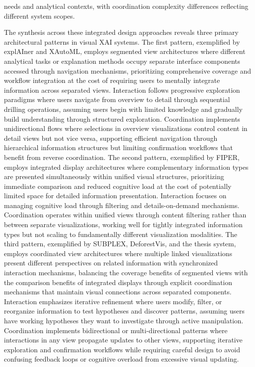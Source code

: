 needs and analytical contexts, with coordination complexity differences reflecting different system scopes.

The synthesis across these integrated design approaches reveals three primary architectural patterns in visual XAI systems. The first pattern, exemplified by explAIner and XAutoML, employs segmented view architectures where different analytical tasks or explanation methods occupy separate interface components accessed through navigation mechanisms, prioritizing comprehensive coverage and workflow integration at the cost of requiring users to mentally integrate information across separated views. Interaction follows progressive exploration paradigms where users navigate from overview to detail through sequential drilling operations, assuming users begin with limited knowledge and gradually build understanding through structured exploration. Coordination implements unidirectional flows where selections in overview visualizations control content in detail views but not vice versa, supporting efficient navigation through hierarchical information structures but limiting confirmation workflows that benefit from reverse coordination. The second pattern, exemplified by FIPER, employs integrated display architectures where complementary information types are presented simultaneously within unified visual structures, prioritizing immediate comparison and reduced cognitive load at the cost of potentially limited space for detailed information presentation. Interaction focuses on managing cognitive load through filtering and details-on-demand mechanisms. Coordination operates within unified views through content filtering rather than between separate visualizations, working well for tightly integrated information types but not scaling to fundamentally different visualization modalities. The third pattern, exemplified by SUBPLEX, DeforestVis, and the thesis system, employs coordinated view architectures where multiple linked visualizations present different perspectives on related information with synchronized interaction mechanisms, balancing the coverage benefits of segmented views with the comparison benefits of integrated displays through explicit coordination mechanisms that maintain visual connections across separated components. Interaction emphasizes iterative refinement where users modify, filter, or reorganize information to test hypotheses and discover patterns, assuming users have working hypotheses they want to investigate through active manipulation. Coordination implements bidirectional or multi-directional patterns where interactions in any view propagate updates to other views, supporting iterative exploration and confirmation workflows while requiring careful design to avoid confusing feedback loops or cognitive overload from excessive visual updating.

